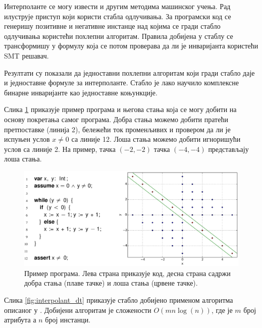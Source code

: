 \documentclass[a4paper]{article}
\begin{document}
{Интерполанте се могу извести и другим методима машинског учења. Рад \cite{KrishnaPW15} илуструје приступ који
користи стабла одлучивања. За програмски код се генеришу позитивне и негативне инстанце над којима се гради
стабло одлучивања користећи похлепни алгоритам. Правила добијена у стаблу се трансформишу у формулу која
се потом проверава да ли је инваријанта користећи \textsc{SMT} решавач.

Резултати су показали да једноставни похлепни алгоритам који гради стабло даје и једноставне формуле
за интерполанте. Стабло је лако научило комплексне бинарне инваријанте као једноставне коњункције.

Слика \ref{fig:interpolant_example2} приказује пример програма и његова стања која се могу добити на основу
покретања самог програма. Добра стања можемо добити пратећи претпоставке (линија 2), бележећи ток променљивих
и провером да ли је испуњен услов $x \neq 0$ са линије 12. Лоша стања можемо добити игноришући услов са линије 2.
На пример, тачка $(-2, -2)$ тачка $(-4, -4)$ представљају лоша стања.

\begin{figure}[h!]
\begin{center}
\includegraphics[scale=0.2]{./slike/interpolant2.png}
\end{center}
    \caption{Пример програма. Лева страна приказује код, десна страна садржи добра стања (плаве тачке) и лоша
    стања (црвене тачке).}
\label{fig:interpolant_example2}
\end{figure}

Слика \ref{fig:interpolant_dt} приказује стабло добијено применом алгоритма описаног у \cite{KrishnaPW15}.
Добијени алгоритам је сложености $O(mn \log(n))$, где је $m$ број атрибута а $n$ број инстанци.

}
\end{document}
